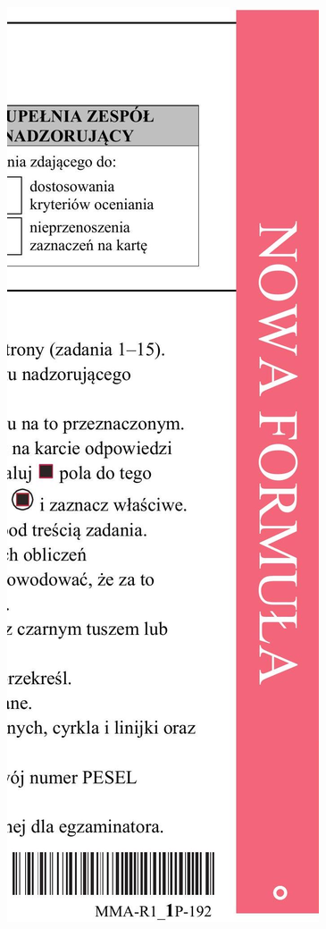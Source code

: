 \documentclass[10pt]{article}
\begin{document}
\includegraphics[max width=\textwidth, center]{2024_11_21_9df891ea1c7ef9791261g-01(1)}
\end{document}
